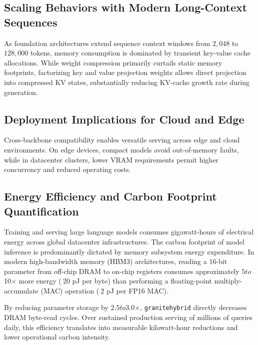 \subsection{Scaling Behaviors with Modern Long-Context Sequences}
As foundation architectures extend sequence context windows from $2{,}048$ to $128{,}000$ tokens, memory consumption is dominated by transient key-value cache allocations. While weight compression primarily curtails static memory footprints, factorizing key and value projection weights allows direct projection into compressed KV states, substantially reducing KV-cache growth rate during generation.

\subsection{Deployment Implications for Cloud and Edge}
Cross-backbone compatibility enables versatile serving across edge and cloud environments. On edge devices, compact models avoid out-of-memory faults, while in datacenter clusters, lower VRAM requirements permit higher concurrency and reduced operating costs.

\subsection{Energy Efficiency and Carbon Footprint Quantification}
Training and serving large language models consumes gigawatt-hours of electrical energy across global datacenter infrastructures. The carbon footprint of model inference is predominantly dictated by memory subsystem energy expenditure. In modern high-bandwidth memory (HBM3) architectures, reading a 16-bit parameter from off-chip DRAM to on-chip registers consumes approximately $5$\times$ to $10$\times$ more energy ($~20$ pJ per byte) than performing a floating-point multiply-accumulate (MAC) operation ($~2$ pJ per FP16 MAC).

By reducing parameter storage by $2.5$\times$ to $3.0$\times$, \texttt{granitehybrid} directly decreases DRAM byte-read cycles. Over sustained production serving of millions of queries daily, this efficiency translates into measurable kilowatt-hour reductions and lower operational carbon intensity.
